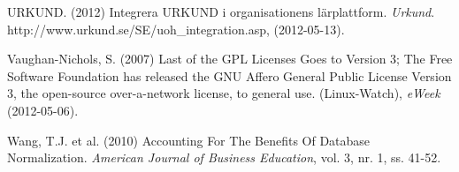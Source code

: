 \begin{flushleft}
URKUND. (2012) Integrera URKUND i organisationens lärplattform. \emph{Urkund}. http://www.urkund.se/SE/uoh\_integration.asp, (2012-05-13).

Vaughan-Nichols, S. (2007) Last of the GPL Licenses Goes to Version 3; The Free Software Foundation has released the GNU Affero General Public License Version 3, the open-source over-a-network license, to general use. (Linux-Watch), \emph{eWeek} (2012-05-06).

Wang, T.J. et al. (2010) Accounting For The Benefits Of Database Normalization. \emph{American Journal of Business Education}, vol. 3, nr. 1, ss. 41-52.


\normalsize
\end{flushleft}


